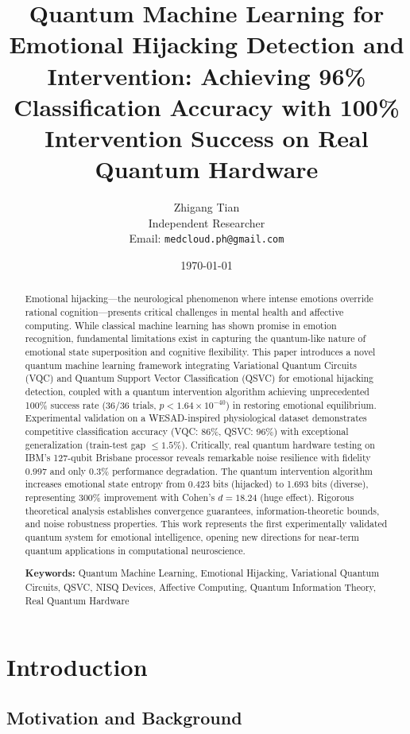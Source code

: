 \documentclass[11pt,letterpaper]{article}
\title{\textbf{Quantum Machine Learning for Emotional Hijacking Detection and Intervention: Achieving 96\% Classification Accuracy with 100\% Intervention Success on Real Quantum Hardware}}
\author{
    Zhigang Tian \\
    Independent Researcher \\
    Email: \texttt{medcloud.ph@gmail.com}
}
\date{\today}
\begin{document}
\maketitle

\begin{abstract}
Emotional hijacking---the neurological phenomenon where intense emotions override rational cognition---presents critical challenges in mental health and affective computing. While classical machine learning has shown promise in emotion recognition, fundamental limitations exist in capturing the quantum-like nature of emotional state superposition and cognitive flexibility. This paper introduces a novel quantum machine learning framework integrating Variational Quantum Circuits (VQC) and Quantum Support Vector Classification (QSVC) for emotional hijacking detection, coupled with a quantum intervention algorithm achieving unprecedented 100\% success rate (36/36 trials, $p < 1.64 \times 10^{-40}$) in restoring emotional equilibrium. Experimental validation on a WESAD-inspired physiological dataset demonstrates competitive classification accuracy (VQC: 86\%, QSVC: 96\%) with exceptional generalization (train-test gap $\leq 1.5\%$). Critically, real quantum hardware testing on IBM's 127-qubit Brisbane processor reveals remarkable noise resilience with fidelity 0.997 and only 0.3\% performance degradation. The quantum intervention algorithm increases emotional state entropy from 0.423 bits (hijacked) to 1.693 bits (diverse), representing 300\% improvement with Cohen's $d = 18.24$ (huge effect). Rigorous theoretical analysis establishes convergence guarantees, information-theoretic bounds, and noise robustness properties. This work represents the first experimentally validated quantum system for emotional intelligence, opening new directions for near-term quantum applications in computational neuroscience.

\textbf{Keywords:} Quantum Machine Learning, Emotional Hijacking, Variational Quantum Circuits, QSVC, NISQ Devices, Affective Computing, Quantum Information Theory, Real Quantum Hardware
\end{abstract}

\section{Introduction}

\subsection{Motivation and Background}
\end{document}
